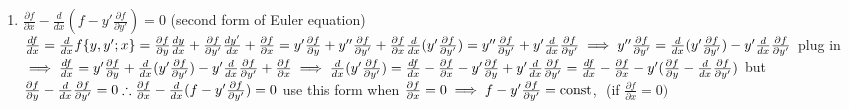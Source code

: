 \documentclass[12pt]{amsart}
\begin{document}
\begin{enumerate}
\item \underline{$\frac{\partial f}{\partial x} - \frac{d}{dx} (f- y' \frac{\partial f}{\partial y'}) = 0$} (second form of Euler equation)\\
$\frac{df}{dx} = \frac{d}{dx} f \{ y, y' ; x \} = \frac{\partial f}{\partial y} \frac{dy}{dx} + \frac{\partial f}{\partial y'} \frac{d y'}{dx} + \frac{\partial f}{\partial x}\\
= y' \frac{\partial f}{\partial y} + y'' \frac{\partial f}{\partial y'} + \frac{\partial f}{\partial x}\\
\frac{d}{dx}(y' \frac{\partial f}{\partial y'}) = y'' \frac{\partial f}{\partial y'} + y' \frac{d}{dx} \frac{\partial f}{\partial y'}\\
\implies y'' \frac{\partial f}{\partial y'} = \frac{d}{dx} (y' \frac{\partial f}{\partial y'})-y' \frac{d}{dx} \frac{\partial f}{\partial y'}\\$
plug in\\
$\implies \frac{df}{dx} = y' \frac{\partial f}{\partial y} + \frac{d}{dx} (y' \frac{\partial f}{\partial y'}) - y' \frac{d}{dx} \frac{\partial f}{\partial y'} + \frac{\partial f}{\partial x}\\
\implies \frac{d}{dx} (y' \frac{\partial f}{\partial y'}) = \frac{df}{dx} - \frac{\partial f}{\partial x} - y' \frac{\partial f}{\partial y} + y' \frac{d}{dx} \frac{\partial f}{\partial y'}\\
= \frac{df}{dx} - \frac{\partial f}{\partial x} - y' (\frac{\partial f}{\partial y} - \frac{d}{dx} \frac{\partial f}{\partial y'})\\$
but $\frac{\partial f}{\partial y} - \frac{d}{dx} \frac{\partial f}{\partial y'}=0\\
\therefore \frac{\partial f}{\partial x} - \frac{d}{dx} (f- y' \frac{\partial f}{\partial y'})=0\\$
use this form when $\frac{\partial f}{\partial x} = 0\\
\implies f - y' \frac{\partial f}{\partial y'} = \rm{const}$,\,\, (if $\frac{\partial f}{\partial x} = 0)$\\


\hdashrule[0.5ex][c]{\linewidth}{0.5pt}{1.5mm}



\end{enumerate}
\end{document}
